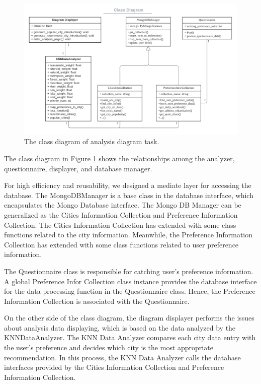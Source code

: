 \documentclass[conference]{IEEEtran}
\begin{document}
\textbf{}

\begin{figure}[htbp]
\centerline{\includegraphics[width=1.0\textwidth]{diagram_structual_context.pdf}}
\caption{The class diagram of analysis diagram task.}
\label{fig_diagram_class}
\end{figure}

The class diagram in Figure \ref{fig_diagram_class} shows the relationships among the analyzer, questionnaire, displayer, and database manager. 

For high efficiency and reusability, we designed a mediate layer for accessing the database. The MongoDBManager is a base class in the database interface, which encapsulates the Mongo Database interface. The Mongo DB Manager can be generalized as the Cities Information Collection and Preference Information Collection. The Cities Information Collection has extended with some class functions related to the city information. Meanwhile, the Preference Information Collection has extended with some class functions related to user preference information.

The Questionnaire class is responsible for catching user's preference information. A global Preference Infor Collection class instance provides the database interface for the data processing function in the Questionnaire class. Hence, the Preference Information Collection is associated with the Questionnaire.

On the other side of the class diagram, the diagram displayer performs the issues about analysis data displaying, which is based on the data analyzed by the KNNDataAnalyzer. The KNN Data Analyzer compares each city data entry with the user's preference and decides which city is the most appropriate recommendation. In this process, the KNN Data Analyzer calls the database interfaces provided by the Cities Information Collection and Preference Information Collection.
\end{document}
